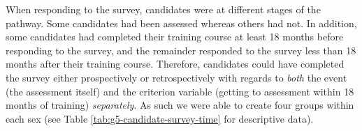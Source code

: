 \documentclass[
  12pt,
  a4paper,
]{book}
\begin{document}
\begin{table}[H]

\caption{\label{tab:group-5-pra-descriptives}Participant descriptive statistics.}
\centering
{}
\end{table}

When responding to the survey, candidates were at different stages of the pathway. Some candidates had been assessed whereas others had not. In addition, some candidates had completed their training course at least 18 months before responding to the survey, and the remainder responded to the survey less than 18 months after their training course. Therefore, candidates could have completed the survey either prospectively or retrospectively with regards to \emph{both} the event (the assessment itself) and the criterion variable (getting to assessment within 18 months of training) \emph{separately}. As such we were able to create four groups within each sex (see Table \ref{tab:g5-candidate-survey-time} for descriptive data).
\end{document}
